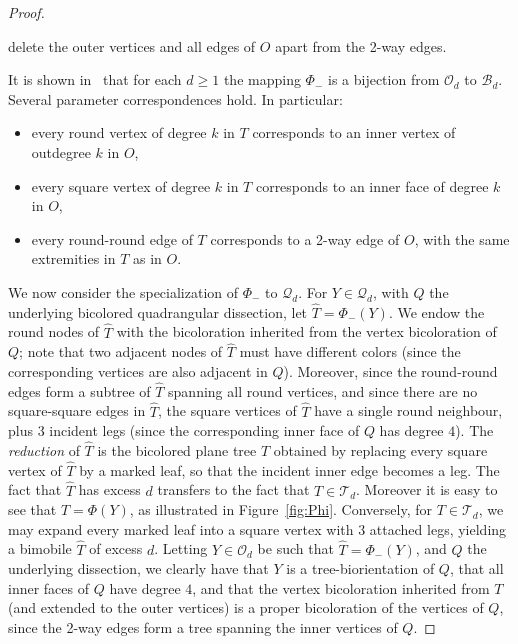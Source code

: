 \documentclass[letter]{amsart}
\numberwithin{theo}{section}
\theoremstyle{remark}
\def\cB{\mathcal{B}}
\def\cQ{\mathcal{Q}}
\def\cO{\mathcal{O}}
\def\cT{\mathcal{T}}
\begin{document}
\begin{proof}
\begin{itemize}
delete the outer vertices and all edges of $O$ apart from the 2-way edges. 
\end{itemize}
It is shown in~\cite{Bernardi-Fusy:dangulations} that for each $d\geq 1$ the mapping $\Phi_-$ is a bijection from $\cO_d$ to $\cB_d$. Several parameter correspondences hold. In particular:
\begin{itemize}
    \item
    every round vertex of degree $k$ in $T$ corresponds to an inner vertex of outdegree $k$ in $O$,
    \item
 every square vertex of degree $k$ in $T$ corresponds to an inner face of degree $k$ in $O$,
\item
  every round-round edge of $T$  corresponds to a 2-way edge of $O$, with the same extremities in $T$ as in $O$.   
\end{itemize}



\medskip

We now consider the specialization of $\Phi_-$ to $\cQ_d$. For $Y\in\cQ_d$, 
with $Q$ the underlying bicolored quadrangular dissection, let $\hat{T}=\Phi_-(Y)$. 
We endow the round nodes of $\hat{T}$ with the bicoloration inherited from the vertex bicoloration of $Q$; note that two adjacent nodes of $\hat{T}$ must have different
 colors (since the corresponding vertices are also adjacent in $Q$). Moreover, since the round-round edges form a subtree of $\hat{T}$ spanning all round vertices, and since there are no square-square edges in $\hat{T}$, the square vertices of $\hat{T}$ have a single round neighbour, plus 3 incident legs (since the corresponding inner face of $Q$ has   degree $4$). The \emph{reduction} of $\hat{T}$ is the bicolored plane tree $T$ obtained by replacing every square vertex of $\hat{T}$ by a marked leaf, so that the incident inner edge becomes a leg. The fact that $\hat{T}$ has excess $d$ transfers to the fact that $T\in\cT_d$. 
 Moreover it is easy to see that $T=\Phi(Y)$, as illustrated in Figure~\ref{fig:Phi}.  Conversely, for $T\in \cT_d$, we may expand every marked leaf into a square vertex with 3 attached legs, yielding a bimobile $\hat{T}$ of excess $d$. Letting $Y\in\cO_d$ be such that 
 $\hat{T}=\Phi_-(Y)$, and $Q$ the underlying dissection, we clearly have that $Y$ is a tree-biorientation of $Q$, that all inner faces of $Q$ have degree $4$, and that the vertex bicoloration inherited from $T$ (and extended to the outer vertices) is a proper bicoloration of the vertices of $Q$, since the 2-way edges form a tree spanning the inner vertices of $Q$. 
\end{proof}
\end{document}
